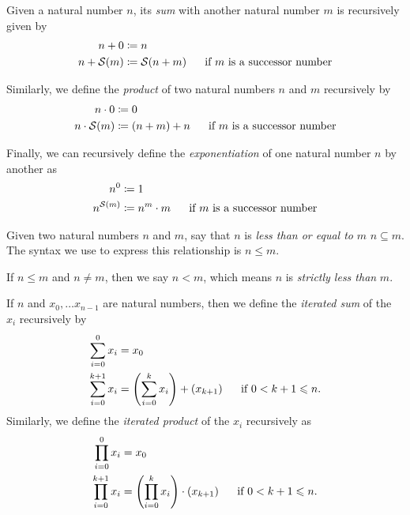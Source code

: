 \begin{definition}
    Given a natural number \(n\),
    its \emph{sum} with another natural number \(m\) is recursively given by
    \begin{align*}
        n + 0 &\defn n\\
        n + \successor{m} &\defn \successor{n + m}~~~~\text{ if } m \text{ is a successor number}
    \end{align*}

    Similarly, we define the \emph{product} of two natural numbers \(n\) and \(m\) recursively by
    \begin{align*}
        n \cdot 0 &\defn 0\\
        n \cdot \successor{m} &\defn \pn*{n + m} + n~~~~\text{ if } m \text{ is a successor number}
    \end{align*}

    Finally, we can recursively define the \emph{exponentiation} of one natural number \(n\) by another as
    \begin{align*}
        n^{0} &\defn 1\\
        n^{\successor{m}} &\defn n^{m} \cdot m~~~~\text{ if } m \text{ is a successor number}
    \end{align*}
\end{definition}

\begin{definition}
    Given two natural numbers \(n\) and \(m\),
    say that \(n\) is \emph{less than or equal to} \(m\) \iffbydefn \(n \subseteq m\).
    The syntax we use to express this relationship is \(n \leq m\).

    If \(n \leq m\) and \(n \neq m\), then we say \(n < m\),
    which means \(n\) is \emph{strictly less than} \(m\).
\end{definition}

\begin{definition}
    If \(n\) and \(x_0, \dots x_{n - 1}\) are natural numbers,
    then we define the \emph{iterated sum} of the \(x_i\) recursively by
    \begin{align*}
        \sum_{i = 0}^{0}x_i &= x_0\\
        \sum_{i = 0}^{k + 1}x_i &= \pn*{\sum_{i = 0}^{k}x_i} + \pn*{x_{k + 1}}~~~~\text{ if } 0 < k + 1 \leq n.
    \end{align*}
    Similarly, we define the \emph{iterated product} of the \(x_i\) recursively as
    \begin{align*}
        \prod_{i = 0}^{0}x_i &= x_0\\
        \prod_{i = 0}^{k + 1}x_i &= \pn*{\prod_{i = 0}^{k}x_i} \cdot \pn*{x_{k + 1}}~~~~\text{ if } 0 < k + 1 \leq n.
    \end{align*}
\end{definition}

